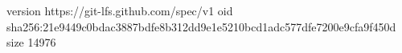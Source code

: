 version https://git-lfs.github.com/spec/v1
oid sha256:21e9449c0bdac3887bdfe8b312dd9e1e5210bcd1adc577dfe7200e9cfa9f450d
size 14976
